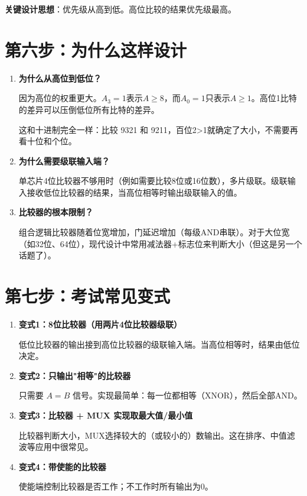 \textbf{关键设计思想}：优先级从高到低。高位比较的结果优先级最高。

\section{第六步：为什么这样设计}

\begin{enumerate}
  \item \textbf{为什么从高位到低位？}

  因为高位的权重更大。$A_3=1$表示$A \geq 8$，而$A_0=1$只表示$A \geq 1$。高位1比特的差异可以压倒低位所有比特的差异。

  这和十进制完全一样：比较 9321 和 9211，百位2>1就确定了大小，不需要再看十位和个位。

  \item \textbf{为什么需要级联输入端？}

  单芯片4位比较器不够用时（例如需要比较8位或16位数），多片级联。级联输入接收低位比较器的结果，当高位相等时输出级联输入的值。

  \item \textbf{比较器的根本限制？}

  组合逻辑比较器随着位宽增加，门延迟增加（每级AND串联）。对于大位宽（如32位、64位），现代设计中常用减法器+标志位来判断大小（但这是另一个话题了）。
\end{enumerate}

\section{第七步：考试常见变式}

\begin{enumerate}
  \item \textbf{变式1：8位比较器（用两片4位比较器级联）}

  低位比较器的输出接到高位比较器的级联输入端。当高位相等时，结果由低位决定。

  \item \textbf{变式2：只输出"相等"的比较器}

  只需要 $A=B$ 信号。实现最简单：每一位都相等（XNOR），然后全部AND。

  \item \textbf{变式3：比较器 + MUX 实现取最大值/最小值}

  比较器判断大小，MUX选择较大的（或较小的）数输出。这在排序、中值滤波等应用中很常见。

  \item \textbf{变式4：带使能的比较器}

  使能端控制比较器是否工作；不工作时所有输出为0。
\end{enumerate}

